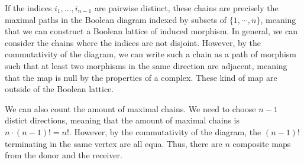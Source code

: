 \documentclass[a4paper]{article}
\begin{document}
If the indices \(i_1,\dots,i_{n-1}\) are pairwise distinct,
these chains are precisely the maximal paths in the Boolean diagram indexed by subsets of \(\{1,\cdots, n\}\),
meaning that we can construct a Boolean lattice of induced morphism.
In general, we can consider the chains where the indices are not disjoint. However,
by the commutativity of the diagram, we can write such a chain as a path of morphism
such that at least two morphisms in the same direction are adjacent, meaning that the map is null
by the properties of a complex. These kind of map are outside of the Boolean lattice.

We can also count the amount of maximal chains. We need to choose \(n-1\) distict
directions, meaning that the amount of maximal chains is \(n\cdot (n-1)! = n!\).
However, by the commutativity of the diagram, the \((n-1)!\) terminating
in the same vertex are all equa. Thus, there are \(n\) composite maps from the
donor and the receiver.
\end{document}
